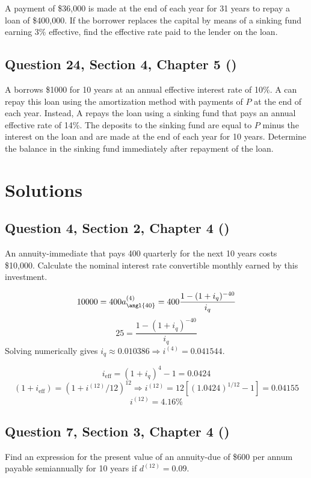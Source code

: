 \documentclass[12pt, a4paper]{article}
\begin{document}
\noindent A payment of \$36{,}000 is made at the end of each year for 31 years to repay a loan of \$400{,}000. If the borrower replaces the capital by means of a sinking fund earning 3\% effective, find the effective rate paid to the lender on the loan.

\subsection*{Question 24, Section 4, Chapter 5  (\cite{toi3rd})}

\noindent A borrows \$1000 for 10 years at an annual effective interest rate of 10\%. A can repay this loan using the amortization method with payments of \( P \) at the end of each year. Instead, A repays the loan using a sinking fund that pays an annual effective rate of 14\%. The deposits to the sinking fund are equal to \( P \) minus the interest on the loan and are made at the end of each year for 10 years. Determine the balance in the sinking fund immediately after repayment of the loan.

\newpage

\section*{Solutions}

\subsection*{Question 4, Section 2, Chapter 4  (\cite{toi3rd})}

\noindent An annuity-immediate that pays 400 quarterly for the next 10 years costs \$10{,}000. Calculate the nominal interest rate convertible monthly earned by this investment.

\[
10000 = 400 a_{\angl{40}}^{(4)} = 400 \frac{1 - (1 + i_q)^{-40}}{i_q}
\]
\[
25 = \frac{1 - (1 + i_q)^{-40}}{i_q}
\]
Solving numerically gives \( i_q \approx 0.010386 \Rightarrow i^{(4)} = 0.041544 \).

\[
i_{\text{eff}} = (1 + i_q)^4 - 1 = 0.0424
\]
\[
(1 + i_{\text{eff}}) = (1 + i^{(12)}/12)^{12}
\Rightarrow i^{(12)} = 12[(1.0424)^{1/12} - 1] = 0.04155
\]
\[
\boxed{i^{(12)} = 4.16\%}
\]

\subsection*{Question 7, Section 3, Chapter 4  (\cite{toi3rd})}

\noindent Find an expression for the present value of an annuity-due of \$600 per annum payable semiannually for 10 years if \( d^{(12)} = 0.09. \)
\end{document}
